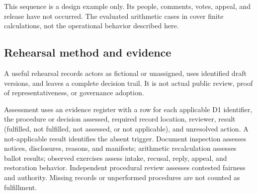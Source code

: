 \documentclass[11pt,a4paper]{article}
\begin{document}
This sequence is a design example only. Its people, comments, votes, appeal, and release have not occurred. The evaluated arithmetic cases in  cover finite calculations, not the operational behavior described here.

\subsection{Rehearsal method and evidence}
A useful rehearsal records actors as fictional or unassigned, uses identified draft versions, and leaves a complete decision trail. It is not actual public review, proof of representativeness, or governance adoption.

Assessment uses an evidence register with a row for each applicable D1 identifier, the procedure or decision assessed, required record location, reviewer, result (fulfilled, not fulfilled, not assessed, or not applicable), and unresolved action. A not-applicable result identifies the absent trigger. Document inspection assesses notices, disclosures, reasons, and manifests; arithmetic recalculation assesses ballot results; observed exercises assess intake, recusal, reply, appeal, and restoration behavior. Independent procedural review assesses contested fairness and authority. Missing records or unperformed procedures are not counted as fulfillment.
\end{document}
